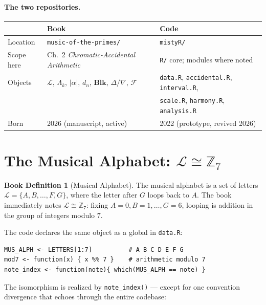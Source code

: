\documentclass[11pt]{article}
\newcommand{\MAlph}{\mathcal{L}}                 %
\newcommand{\Lam}{\Lambda}                      %
\newcommand{\BL}{\overline{\textbf{Blk}}}       %
\newcommand{\Maj}{\Delta}                       %
\newcommand{\Min}{\nabla}                       %
\newcommand{\FC}{\mathcal{F}}                   %
\newcommand{\Zseven}{\mathbb{Z}_7}
\theoremstyle{definition}
\newtheorem{bookdef}{Book Definition}[section]
\theoremstyle{remark}
\newcommand{\code}[1]{\texttt{#1}}
\newcommand{\file}[1]{\texttt{#1}}
\begin{document}
\paragraph{The two repositories.}
\begin{center}
\renewcommand{\arraystretch}{1.25}
\begin{tabular}{@{}lll@{}}
\toprule
 & \textbf{Book} & \textbf{Code} \\
\midrule
Location & \file{music-of-the-primes/} & \file{mistyR/} \\
Scope here & Ch.~2 \emph{Chromatic-Accidental Arithmetic} & \file{R/} core; modules where noted \\
Objects & $\MAlph$, $\Lam_k$, $|\alpha|$, $d_n$, $\BL$, $\Maj/\Min$, $\FC$ & \file{data.R}, \file{accidental.R}, \file{interval.R}, \\
 & & \file{scale.R}, \file{harmony.R}, \file{analysis.R} \\
Born & 2026 (manuscript, active) & 2022 (prototype, revived 2026) \\
\bottomrule
\end{tabular}
\end{center}

\section{The Musical Alphabet: $\MAlph \cong \Zseven$}

\begin{bookdef}[Musical Alphabet]
The musical alphabet is a set of letters $\MAlph = \{A, B, \dots, F, G\}$, where
the letter after $G$ loops back to $A$. The book immediately notes
$\MAlph \cong \Zseven$: fixing $A = 0, B = 1, \dots, G = 6$, looping is addition
in the group of integers modulo $7$.
\end{bookdef}

The code declares the same object as a global in \file{data.R}:

\begin{lstlisting}
MUS_ALPH <- LETTERS[1:7]          # A B C D E F G
mod7 <- function(x) { x %% 7 }    # arithmetic modulo 7
note_index <- function(note){ which(MUS_ALPH == note) }
\end{lstlisting}

The isomorphism is realized by \code{note\_index()} --- except for one
convention divergence that echoes through the entire codebase:
\end{document}
